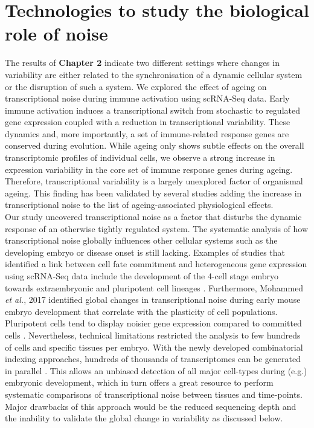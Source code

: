 \newpage

\section{Technologies to study the biological role of noise}

The results of \textbf{Chapter 2} indicate two different settings where changes in variability are either related to the synchronisation of a dynamic cellular system or the disruption of such a system. We explored the effect of ageing on transcriptional noise during immune activation using scRNA-Seq data. Early immune activation induces a transcriptional switch from stochastic to regulated gene expression coupled with a reduction in transcriptional variability. These dynamics and, more importantly, a set of immune-related response genes are conserved during evolution. While ageing only shows subtle effects on the overall transcriptomic profiles of individual cells, we observe a strong increase in expression variability in the core set of immune response genes during ageing. Therefore, transcriptional variability is a largely unexplored factor of organismal ageing. This finding has been validated by several studies \citep{Enge2017, Angelidis2018, Cheung2018} adding the increase in transcriptional noise to the list of ageing-associated physiological effects.\\

Our study uncovered transcriptional noise as a factor that disturbs the dynamic response of an otherwise tightly regulated system. The systematic analysis of how transcriptional noise globally influences other cellular systems such as the developing embryo or disease onset is still lacking. Examples of studies that identified a link between cell fate commitment and heterogeneous gene expression using scRNA-Seq data include the development of the 4-cell stage embryo towards extraembryonic and pluripotent cell lineages \citep{Goolam2016}. Furthermore, Mohammed \emph{et al.}, 2017 identified global changes in transcriptional noise during early mouse embryo development that correlate with the plasticity of cell populations. Pluripotent cells tend to display noisier gene expression compared to committed cells \citep{Mohammed2017}. Nevertheless, technical limitations restricted the analysis to few hundreds of cells and specific tissues per embryo. With the newly developed combinatorial indexing approaches, hundreds of thousands of transcriptomes can be generated in parallel \citep{Cao2017}. This allows an unbiased detection of all major cell-types during (e.g.) embryonic development, which in turn offers a great resource to perform systematic comparisons of transcriptional noise between tissues and time-points. Major drawbacks of this approach would be the reduced sequencing depth and the inability to validate the global change in variability as discussed below.\\

